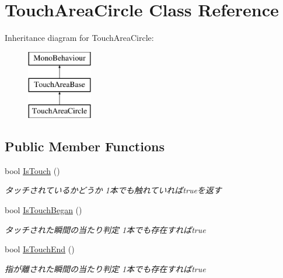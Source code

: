 \hypertarget{class_touch_area_circle}{}\section{Touch\+Area\+Circle Class Reference}
\label{class_touch_area_circle}
Inheritance diagram for Touch\+Area\+Circle\+:\begin{figure}[H]
\begin{center}
\leavevmode
\includegraphics[height=3.000000cm]{class_touch_area_circle}
\end{center}
\end{figure}
\subsection*{Public Member Functions}
\begin{DoxyCompactItemize}
\item 
bool \hyperlink{class_touch_area_circle_a550aad828bc134613c5f207d79073073}{Is\+Touch} ()
\begin{DoxyCompactList}\small\item\em タッチされているかどうか 1本でも触れていればtrueを返す \end{DoxyCompactList}\item 
bool \hyperlink{class_touch_area_circle_afcb42f0b4356b685d22f8f12a04a61db}{Is\+Touch\+Began} ()
\begin{DoxyCompactList}\small\item\em タッチされた瞬間の当たり判定 1本でも存在すればtrue \end{DoxyCompactList}\item 
bool \hyperlink{class_touch_area_circle_adf05e73cd92075870039f9f00bc77b9b}{Is\+Touch\+End} ()
\begin{DoxyCompactList}\small\item\em 指が離された瞬間の当たり判定 1本でも存在すればtrue \end{DoxyCompactList}\end{DoxyCompactItemize}
